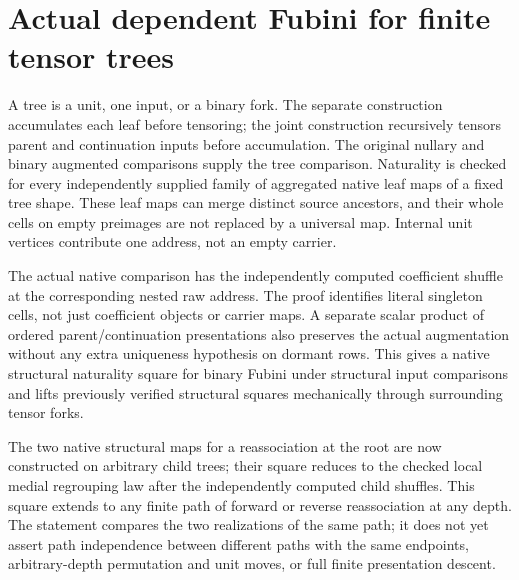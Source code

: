 \documentclass{article}
\begin{document}
\section*{Actual dependent Fubini for finite tensor trees}
A tree is a unit, one input, or a binary fork. The separate
construction accumulates each leaf before tensoring; the joint
construction recursively tensors parent and continuation inputs
before accumulation. The original nullary and binary augmented
comparisons supply the tree comparison. Naturality is checked
for every independently supplied family of aggregated native
leaf maps of a fixed tree shape. These leaf maps can merge
distinct source ancestors, and their whole cells on empty
preimages are not replaced by a universal map. Internal unit
vertices contribute one address, not an empty carrier.

The actual native comparison has the independently computed
coefficient shuffle at the corresponding nested raw address.
The proof identifies literal singleton cells, not just coefficient
objects or carrier maps. A separate scalar product of
ordered parent/continuation presentations also preserves the
actual augmentation without any extra uniqueness hypothesis
on dormant rows. This gives a native structural naturality
square for binary Fubini under structural input comparisons
and lifts previously verified structural squares mechanically
through surrounding tensor forks.

The two native structural maps for a reassociation at the root
are now constructed on arbitrary child trees; their square
reduces to the checked local medial regrouping law after
the independently computed child shuffles. This square extends
to any finite path of forward or reverse reassociation at any
depth. The statement compares the two realizations of the
same path; it does not yet assert path independence between
different paths with the same endpoints, arbitrary-depth
permutation and unit moves, or full finite presentation descent.
\end{document}
